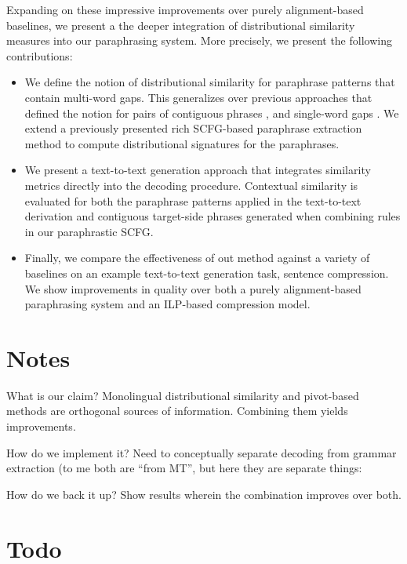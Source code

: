 \documentclass[11pt]{article}
\begin{document}
Expanding on these impressive improvements over purely alignment-based
baselines, we present a the deeper integration of distributional
similarity measures into our paraphrasing system. More precisely, we
present the following contributions:
\begin{itemize}
\item We define the notion of distributional similarity for paraphrase
  patterns that contain multi-word gaps. This generalizes over
  previous approaches that defined the notion for pairs of contiguous
  phrases \cite{Chan2011}, and single-word gaps
  \cite{Lin2001,Bhagat2008}. We extend a previously presented rich
  SCFG-based paraphrase extraction method \cite{Ganitkevitch2011} to
  compute distributional signatures for the paraphrases.

\item We present a text-to-text generation approach that integrates
  similarity metrics directly into the decoding procedure. Contextual
  similarity is evaluated for both the paraphrase patterns applied in
  the text-to-text derivation and contiguous target-side phrases
  generated when combining rules in our paraphrastic SCFG.

\item Finally, we compare the effectiveness of out method against a
  variety of baselines on an example text-to-text generation task,
  sentence compression. We show improvements in quality over both a
  purely alignment-based paraphrasing system and an ILP-based
  compression model.
\end{itemize}


\section{Notes}

What is our claim? Monolingual distributional similarity and
pivot-based methods are orthogonal sources of information. Combining
them yields improvements.

How do we implement it? Need to conceptually separate decoding from
grammar extraction (to me both are ``from MT'', but here they are
separate things: 

How do we back it up? Show results wherein the combination improves
over both.


\section{Todo}
\end{document}
